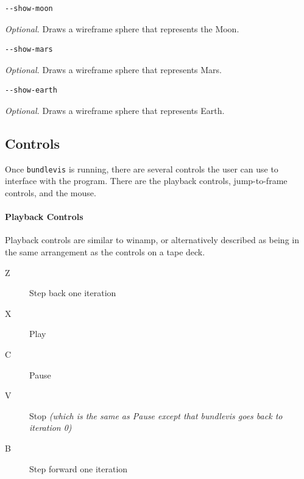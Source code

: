 \begin{verbatim}
--show-moon
\end{verbatim}

\emph{Optional.} Draws a wireframe sphere that represents the Moon.

\begin{verbatim}
--show-mars
\end{verbatim}

\emph{Optional.} Draws a wireframe sphere that represents Mars.

\begin{verbatim}
--show-earth
\end{verbatim}

\emph{Optional.} Draws a wireframe sphere that represents Earth.

\subsection{Controls}

Once \texttt{bundlevis} is running, there are several controls the user can use to interface with the program. There are the playback controls, jump-to-frame controls, and the mouse.

\paragraph{Playback Controls}
Playback controls are similar to winamp, or alternatively described as
being in the same arrangement as the controls on a tape deck.

\newenvironment{myindentpar}[1]
               {\begin{list}{}
                   {\setlength{\leftmargin}{#1}}
                 \item[]
               }
               {\end{list}}

\begin{myindentpar}{3cm}
\begin{description}
  \item[Z] Step back one iteration
  \item[X] Play
  \item[C] Pause
  \item[V] Stop \emph{(which is the same as Pause except that
    bundlevis goes back to iteration 0)}
  \item[B] Step forward one iteration
\end{description}
\end{myindentpar}

